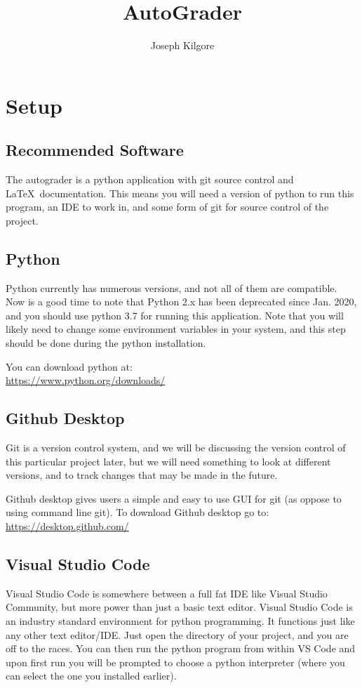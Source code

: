 \documentclass[10pt,a4paper]{book}
\title{AutoGrader}
\author{Joseph Kilgore}
\begin{document}
\frontmatter
\maketitle
\tableofcontents

\mainmatter

\chapter{Setup}
\section{Recommended Software}
The autograder is a python application with git source control and \LaTeX\  documentation. This means you will need a version of python to run this program, an IDE to work in, and some form of git for source control of the project.

\section{Python}
Python currently has numerous versions, and not all of them are compatible. Now is a good time to note that Python 2.x has been deprecated since Jan. 2020, and you should use python 3.7 for running this application. Note that you will likely need to change some environment variables in your system, and this step should be done during the python installation.

You can download python at: \\
\href{https://www.python.org/downloads/}{https://www.python.org/downloads/}


\section{Github Desktop}
Git is a version control system, and we will be discussing the version control of this particular project later, but we will need something to look at different versions, and to track changes that may be made in the future.

Github desktop gives users a simple and easy to use GUI for git (as oppose to using command line git). To download Github desktop go to: \\
\href{https://desktop.github.com/}{https://desktop.github.com/}

\section{Visual Studio Code}
Visual Studio Code is somewhere between a full fat IDE like Visual Studio Community, but more power than just a basic text editor. Visual Studio Code is an industry standard environment for python programming. It functions just like any other text editor/IDE. Just open the directory of your project, and you are off to the races. You can then run the python program from within VS Code and upon first run you will be prompted to choose a python interpreter (where you can select the one you installed earlier).
\end{document}
